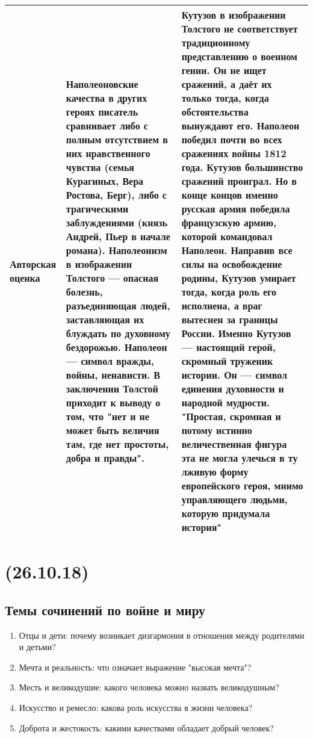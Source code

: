 \documentclass{article}
\begin{document}
\begin{longtable}[c]{|p{2cm}|p{5cm}|p{5cm}|}
  \hline
  Авторская оценка & Наполеоновские качества в других героях писатель сравнивает либо с полным отсутствием в них нравственного чувства (семья Курагиных, Вера Ростова, Берг), либо с трагическими заблуждениями (князь Андрей, Пьер в начале романа). Наполеонизм в изображении Толстого --- опасная болезнь, разъединяющая людей, заставляющая их блуждать по духовному бездорожью. Наполеон --- символ вражды, войны, ненависти. В заключении Толстой приходит к выводу о том, что "нет и не может быть величия там, где нет простоты, добра и правды". & Кутузов в изображении Толстого не соответствует традиционному представлению о военном гении. Он не ищет сражений, а даёт их только тогда, когда обстоятельства вынуждают его. Наполеон победил почти во всех сражениях войны 1812 года. Кутузов большинство сражений проиграл. Но в конце концов именно русская армия победила французскую армию, которой командовал Наполеон. Направив все силы на освобождение родины, Кутузов умирает тогда, когда роль его исполнена, а враг вытеснен за границы России. Именно Кутузов --- настоящий герой, скромный труженик истории. Он --- символ единения духовности и народной мудрости. "Простая, скромная и потому истинно величественная фигура эта не могла улечься в ту лживую форму европейского героя, мнимо управляющего людьми, которую придумала история"\\
  \hline
\end{longtable}

\newpage
\noindent\makebox[\linewidth]{\rule{\paperwidth}{0.4pt}}
\section{(26.10.18)}
\noindent\makebox[\linewidth]{\rule{\paperwidth}{0.4pt}}

\subsection{Темы сочинений по войне и миру}

\begin{enumerate}
\item
  Отцы и дети: почему возникает дизгармония в отношения между родителями и детьми?
\item
  Мечта и реальность: что означает выражение "высокая мечта"?
\item
  Месть и великодушие: какого человека можно назвать великодушным?
\item
  Искусство и ремесло: какова роль искусства в жизни человека?
\item
  Доброта и жестокость: какими качествами обладает добрый человек?
\end{enumerate}
\end{document}
